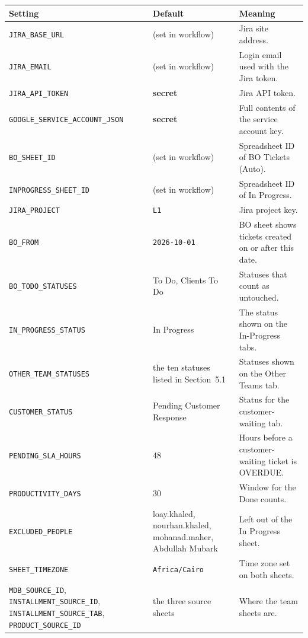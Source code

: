 \documentclass[11pt,a4paper]{article}
\newcommand{\code}[1]{\texttt{#1}}
\begin{document}
\begin{longtable}{@{}p{5.5cm} p{3.0cm} p{5.7cm}@{}}
\toprule
\textbf{Setting} & \textbf{Default} & \textbf{Meaning} \\
\midrule
\endhead
\code{JIRA\_BASE\_URL} & (set in workflow) & Jira site address. \\
\code{JIRA\_EMAIL} & (set in workflow) & Login email used with the Jira token. \\
\code{JIRA\_API\_TOKEN} & \textbf{secret} & Jira API token. \\
\code{GOOGLE\_SERVICE\_\allowbreak ACCOUNT\_JSON} & \textbf{secret} & Full contents of the service account key. \\
\code{BO\_SHEET\_ID} & (set in workflow) & Spreadsheet ID of BO Tickets (Auto). \\
\code{INPROGRESS\_SHEET\_ID} & (set in workflow) & Spreadsheet ID of In Progress. \\
\code{JIRA\_PROJECT} & \code{L1} & Jira project key. \\
\code{BO\_FROM} & \code{2026-10-01} & BO sheet shows tickets created on or after this date. \\
\code{BO\_TODO\_STATUSES} & To Do, Clients To Do & Statuses that count as untouched. \\
\code{IN\_PROGRESS\_STATUS} & In Progress & The status shown on the In-Progress tabs. \\
\code{OTHER\_TEAM\_STATUSES} & the ten statuses listed in Section~5.1 & Statuses shown on the Other Teams tab. \\
\code{CUSTOMER\_STATUS} & Pending Customer Response & Status for the customer-waiting tab. \\
\code{PENDING\_SLA\_HOURS} & 48 & Hours before a customer-waiting ticket is OVERDUE. \\
\code{PRODUCTIVITY\_DAYS} & 30 & Window for the Done counts. \\
\code{EXCLUDED\_PEOPLE} & loay.khaled, nourhan.khaled, mohanad.maher, Abdullah Mubark & Left out of the In Progress sheet. \\
\code{SHEET\_TIMEZONE} & \code{Africa/Cairo} & Time zone set on both sheets. \\
\code{MDB\_SOURCE\_ID}, \code{INSTALLMENT\_\allowbreak SOURCE\_ID}, \code{INSTALLMENT\_\allowbreak SOURCE\_TAB}, \code{PRODUCT\_SOURCE\_ID} & the three source sheets & Where the team sheets are. \\
\bottomrule
\end{longtable}
\end{document}
